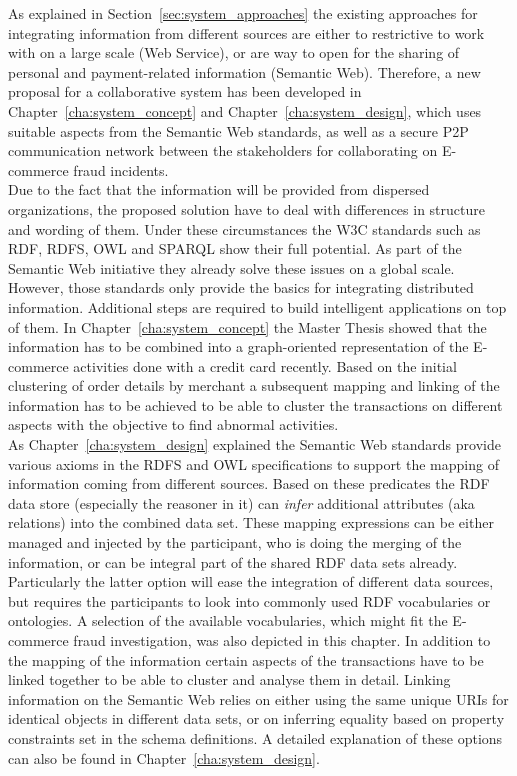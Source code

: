 As explained in Section~\ref{sec:system_approaches} the existing approaches for integrating information from different sources are either to restrictive to work with on a large scale (Web Service), or are way to open for the sharing of personal and payment-related information (Semantic Web). Therefore, a new proposal for a collaborative system has been developed in Chapter~\ref{cha:system_concept} and Chapter~\ref{cha:system_design}, which uses suitable aspects from the Semantic Web standards, as well as a secure \gls{P2P} communication network between the stakeholders for collaborating on \gls{E-commerce} fraud incidents. \\

Due to the fact that the information will be provided from dispersed organizations, the proposed solution have to deal with differences in structure and wording of them. Under these circumstances the \gls{W3C} standards such as \gls{RDF}, \gls{RDFS}, \gls{OWL} and \gls{SPARQL} show their full potential. As part of the Semantic Web initiative they already solve these issues on a global scale. However, those standards only provide the basics for integrating distributed information. Additional steps are required to build intelligent applications on top of them. In Chapter~\ref{cha:system_concept} the Master Thesis showed that the information has to be combined into a graph-oriented representation of the \gls{E-commerce} activities done with a credit card recently. Based on the initial clustering of order details by merchant a subsequent mapping and linking of the information has to be achieved to be able to cluster the transactions on different aspects with the objective to find abnormal activities. \\

As Chapter~\ref{cha:system_design} explained the Semantic Web standards provide various axioms in the \gls{RDFS} and \gls{OWL} specifications to support the mapping of information coming from different sources. Based on these predicates the \gls{RDF} data store (especially the reasoner in it) can \emph{infer} additional attributes (aka relations) into the combined data set. These mapping expressions can be either managed and injected by the participant, who is doing the merging of the information, or can be integral part of the shared \gls{RDF} data sets already. Particularly the latter option will ease the integration of different data sources, but requires the participants to look into commonly used \gls{RDF} vocabularies or ontologies. A selection of the available vocabularies, which might fit the \gls{E-commerce} fraud investigation, was also depicted in this chapter. In addition to the mapping of the information certain aspects of the transactions have to be linked together to be able to cluster and analyse them in detail. Linking information on the Semantic Web relies on either using the same unique \gls{URI}s for identical objects in different data sets, or on inferring equality based on property constraints set in the schema definitions. A detailed explanation of these options can also be found in Chapter~\ref{cha:system_design}. \\

